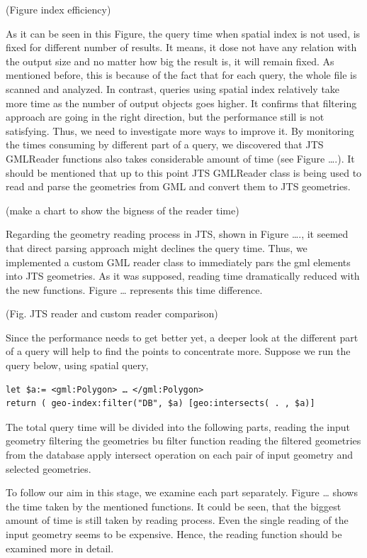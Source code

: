 \documentclass[a4paper,12pt]{article}
\begin{document}
(Figure index efficiency)

As it can be seen in this Figure, the query time when spatial index is not used, is fixed for different number of results. It means, it dose not have any relation with the output size and no matter how big the result is, it will remain fixed. As mentioned before, this is because of the fact that for each query, the whole file is scanned and analyzed. In contrast, queries using spatial index relatively take more time as the number of output objects goes higher. It confirms that filtering approach are going in the right direction, but the performance still is not satisfying. Thus, we need to investigate more ways to improve it.
By monitoring the times consuming by different part of a query, we discovered that JTS GMLReader functions also takes considerable amount of time (see Figure ….). It should be mentioned that up to this point JTS GMLReader class is being used to read and parse the geometries from GML and convert them to JTS geometries.  

(make a chart to show the bigness of the reader time)

Regarding the geometry reading process in JTS, shown in Figure …., it seemed that direct parsing approach might declines the query time. Thus, we implemented a custom GML reader class to immediately pars the gml elements into JTS geometries. As it was supposed, reading time dramatically reduced with the new functions. Figure … represents this time difference.

 (Fig. JTS reader and custom reader comparison)

Since the performance needs to get better yet, a deeper look at the different part of a query will help to find the points to concentrate more. Suppose we run the query below, using spatial query,
\begin{verbatim}
let $a:= <gml:Polygon> … </gml:Polygon>
return ( geo-index:filter("DB", $a) [geo:intersects( . , $a)]
\end{verbatim}
The total query time will be divided into the following parts,
reading the input geometry
filtering the geometries bu filter function 
reading the filtered geometries from the database
apply intersect operation on each pair of input geometry and selected geometries.

To follow our aim in this stage, we examine each part separately. Figure … shows the time taken by the mentioned functions. It could be seen, that the biggest amount of time is still taken by reading process. Even the single reading of the input geometry seems to be expensive. Hence, the reading function should be examined more in detail.
\end{document}

